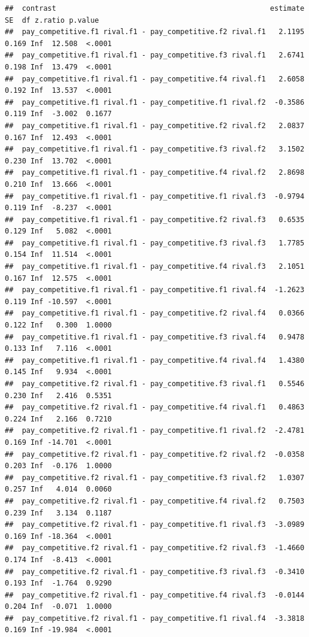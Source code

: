 \documentclass[
]{article}
\begin{document}
\begin{verbatim}
##  contrast                                                  estimate    SE  df z.ratio p.value
##  pay_competitive.f1 rival.f1 - pay_competitive.f2 rival.f1   2.1195 0.169 Inf  12.508  <.0001
##  pay_competitive.f1 rival.f1 - pay_competitive.f3 rival.f1   2.6741 0.198 Inf  13.479  <.0001
##  pay_competitive.f1 rival.f1 - pay_competitive.f4 rival.f1   2.6058 0.192 Inf  13.537  <.0001
##  pay_competitive.f1 rival.f1 - pay_competitive.f1 rival.f2  -0.3586 0.119 Inf  -3.002  0.1677
##  pay_competitive.f1 rival.f1 - pay_competitive.f2 rival.f2   2.0837 0.167 Inf  12.493  <.0001
##  pay_competitive.f1 rival.f1 - pay_competitive.f3 rival.f2   3.1502 0.230 Inf  13.702  <.0001
##  pay_competitive.f1 rival.f1 - pay_competitive.f4 rival.f2   2.8698 0.210 Inf  13.666  <.0001
##  pay_competitive.f1 rival.f1 - pay_competitive.f1 rival.f3  -0.9794 0.119 Inf  -8.237  <.0001
##  pay_competitive.f1 rival.f1 - pay_competitive.f2 rival.f3   0.6535 0.129 Inf   5.082  <.0001
##  pay_competitive.f1 rival.f1 - pay_competitive.f3 rival.f3   1.7785 0.154 Inf  11.514  <.0001
##  pay_competitive.f1 rival.f1 - pay_competitive.f4 rival.f3   2.1051 0.167 Inf  12.575  <.0001
##  pay_competitive.f1 rival.f1 - pay_competitive.f1 rival.f4  -1.2623 0.119 Inf -10.597  <.0001
##  pay_competitive.f1 rival.f1 - pay_competitive.f2 rival.f4   0.0366 0.122 Inf   0.300  1.0000
##  pay_competitive.f1 rival.f1 - pay_competitive.f3 rival.f4   0.9478 0.133 Inf   7.116  <.0001
##  pay_competitive.f1 rival.f1 - pay_competitive.f4 rival.f4   1.4380 0.145 Inf   9.934  <.0001
##  pay_competitive.f2 rival.f1 - pay_competitive.f3 rival.f1   0.5546 0.230 Inf   2.416  0.5351
##  pay_competitive.f2 rival.f1 - pay_competitive.f4 rival.f1   0.4863 0.224 Inf   2.166  0.7210
##  pay_competitive.f2 rival.f1 - pay_competitive.f1 rival.f2  -2.4781 0.169 Inf -14.701  <.0001
##  pay_competitive.f2 rival.f1 - pay_competitive.f2 rival.f2  -0.0358 0.203 Inf  -0.176  1.0000
##  pay_competitive.f2 rival.f1 - pay_competitive.f3 rival.f2   1.0307 0.257 Inf   4.014  0.0060
##  pay_competitive.f2 rival.f1 - pay_competitive.f4 rival.f2   0.7503 0.239 Inf   3.134  0.1187
##  pay_competitive.f2 rival.f1 - pay_competitive.f1 rival.f3  -3.0989 0.169 Inf -18.364  <.0001
##  pay_competitive.f2 rival.f1 - pay_competitive.f2 rival.f3  -1.4660 0.174 Inf  -8.413  <.0001
##  pay_competitive.f2 rival.f1 - pay_competitive.f3 rival.f3  -0.3410 0.193 Inf  -1.764  0.9290
##  pay_competitive.f2 rival.f1 - pay_competitive.f4 rival.f3  -0.0144 0.204 Inf  -0.071  1.0000
##  pay_competitive.f2 rival.f1 - pay_competitive.f1 rival.f4  -3.3818 0.169 Inf -19.984  <.0001

\end{verbatim}
\end{document}
